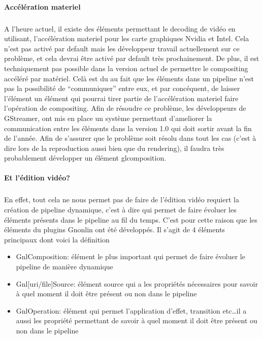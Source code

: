 
\paragraph{Accélération materiel}

\subparagraph{}

A l'heure actuel, il existe des éléments permettant le decoding de
vidéo en utilisant, l'accélération materiel pour les carte graphiques
Nvidia et Intel. Cela n'est pas activé par default mais les développeur
travail actuellement sur ce problème, et cela devrai être activé par
default très prochainement. De plus, il est techniquement pas possible
dans la version actuel de permettre le compositing accéléré par
matériel. Celà est du au fait que les éléments dans un pipeline n'est
pas la possibilité de ``communiquer'' entre eux, et par concéquent,
de laisser l'élément un élément qui pourrai tirer partie de
l'accélération materiel faire l'opération de compositing. Afin de
résoudre ce problème, les développeurs de GStreamer, ont mis en place
un système permettant d'ameliorer la communication entre les éléments
dans la version 1.0 qui doit sortir avant la fin de l'année. Afin de
s'assurer que le problème soit résolu dans tout les cas (c'est à dire
lors de la reproduction aussi bien que du rendering), il faudra très
probablement développer un élément glcomposition.

\paragraph{Et l'édition vidéo?}

\subparagraph{}

En effet, tout cela ne nous permet pas de faire  de l'édition vidéo
requiert la création de pipeline dynamique, c'est à dire qui permet
de faire évoluer les éléments présents dans le pipeline au fil du
temps.  C'est pour cette raison que les éléments du plugins Gnonlin
ont été développés. Il s'agit de 4 éléments principaux dont voici
la définition

\begin{itemize}

  \item {GnlComposition: élément le plus important qui permet de
  faire évoluer
    le pipeline de manière dynamique}

  \item{Gnl[uri/file]Source: élément source qui a les propriétés
    nécessaires pour savoir à quel moment il doit être présent ou
    non dans le pipeline}

  \item{GnlOperation: élément qui permet l'application d'effet,
  transition
    etc\ldots il a aussi les propriété permettant de savoir à quel
    moment il doit être présent ou non dans le pipeline}

\end{itemize}

